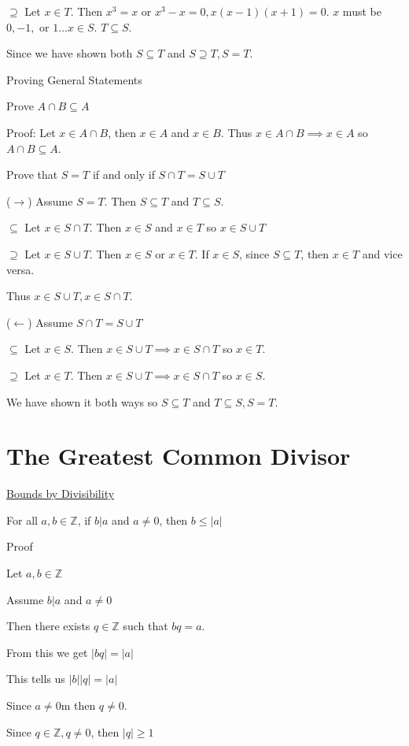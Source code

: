 \documentclass{article}
\begin{document}
$\supseteq$ Let $x \in T$. Then $x^3 = x$ or $x^3 - x = 0, x(x-1)(x+1) = 0$. $x$ must be $0,-1,$ or $1 \ldots x \in S$. $T \subseteq S$.

Since we have shown both $S \subseteq T$ and $S \supseteq T, S = T$.

Proving General Statements 

Prove $A \cap B \subseteq A$

Proof: Let $x \in A \cap B$, then $x \in A$ and $x \in B$. Thus $x \in A \cap B \implies x \in A$ so $A \cap B \subseteq A$.

Prove that $S = T$ if and only if $S \cap T = S \cup T$

($\rightarrow$) Assume $S = T$. Then $S \subseteq T$ and $T \subseteq S$. 

$\subseteq$ Let $x \in S \cap T$. Then $x \in S$ and $x \in T$ so $x \in S \cup T$

$\supseteq$ Let $x \in S \cup T$. Then $x \in S$ or $x \in T$. If $x \in S$, since $S \subseteq T$, then $x \in T$ and vice versa. 

Thus $x \in S \cup T, x \in S \cap T$.

($\leftarrow$) Assume $S \cap T = S \cup T$

$\subseteq$ Let $x \in S$. Then $x \in S \cup T \implies x \in S \cap T$ so $x \in T$.

$\supseteq$ Let $x \in T$. Then $x \in S \cup T \implies x \in S \cap T$ so $x \in S$.

We have shown it both ways so $S \subseteq T$ and $T \subseteq S, S = T$.


\section{The Greatest Common Divisor}

\underline{Bounds by Divisibility}

For all $a,b \in \mathbb{Z}$, if $b \vert a$ and $a \ne 0$, then $ b \le |a|$

Proof

Let $a,b \in \mathbb{Z}$

Assume $b \vert a$ and $a \ne 0$

Then there exists $q \in \mathbb{Z}$ such that $bq = a$.

From this we get $|bq| = |a|$

This tells us $|b||q| = |a|$

Since $a \ne 0$m then $q \ne 0$. 

Since $q \in \mathbb{Z}, q \ne 0$, then $|q| \ge 1$
\end{document}
